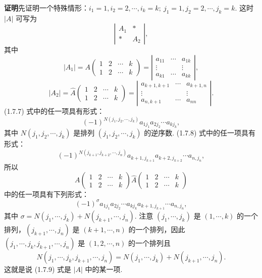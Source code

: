 \documentclass[UTF8,12pt,a4paper,fontset=fandol]{ctexart}
\begin{document}
\noindent\textbf{证明}\quad 先证明一个特殊情形：$i_1=1,i_2=2,\cdots,i_k=k;\ j_1=1,j_2=2,\cdots,j_k=k$. 这时 $|A|$ 可写为
\begin{equation}
\left|\begin{array}{cc}
A_1&*\\
*&A_2
\end{array}\right|,
\tag{1.7.6}
\end{equation}
其中
\begin{equation}
|A_1|=A\left(\begin{array}{cccc}
1&2&\cdots&k\\
1&2&\cdots&k
\end{array}\right)
=
\left|\begin{array}{ccc}
a_{11}&\cdots&a_{1k}\\
\vdots&&\vdots\\
a_{k1}&\cdots&a_{kk}
\end{array}\right|,
\tag{1.7.7}
\end{equation}
\begin{equation}
|A_2|=\widehat{A}\left(\begin{array}{cccc}
1&2&\cdots&k\\
1&2&\cdots&k
\end{array}\right)
=
\left|\begin{array}{ccc}
a_{k+1,k+1}&\cdots&a_{k+1,n}\\
\vdots&&\vdots\\
a_{n,k+1}&\cdots&a_{nn}
\end{array}\right|.
\tag{1.7.8}
\end{equation}
(1.7.7) 式中的任一项具有形式：
\[
(-1)^{N(j_1,j_2,\cdots,j_k)}a_{1j_1}a_{2j_2}\cdots a_{kj_k},
\]
其中 $N(j_1,j_2,\cdots,j_k)$ 是排列 $(j_1,j_2,\cdots,j_k)$ 的逆序数. (1.7.8) 式中的任一项具有形式：
\[
(-1)^{N(j_{k+1},j_{k+2},\cdots,j_n)}a_{k+1,j_{k+1}}a_{k+2,j_{k+2}}\cdots a_{n,j_n},
\]
所以
\[
A\left(\begin{array}{cccc}
1&2&\cdots&k\\
1&2&\cdots&k
\end{array}\right)
\widehat{A}\left(\begin{array}{cccc}
1&2&\cdots&k\\
1&2&\cdots&k
\end{array}\right)
\]
中的任一项具有下列形式：
\begin{equation}
(-1)^\sigma a_{1j_1}a_{2j_2}\cdots a_{kj_k}a_{k+1,j_{k+1}}\cdots a_{n,j_n},
\tag{1.7.9}
\end{equation}
其中 $\sigma=N(j_1,\cdots,j_k)+N(j_{k+1},\cdots,j_n)$. 注意 $(j_1,\cdots,j_k)$ 是 $(1,\cdots,k)$ 的一个排列，$(j_{k+1},\cdots,j_n)$ 是 $(k+1,\cdots,n)$ 的一个排列，因此 $(j_1,\cdots,j_k,j_{k+1},\cdots,j_n)$ 是 $(1,2,\cdots,n)$ 的一个排列且
\[
N(j_1,\cdots,j_k,j_{k+1},\cdots,j_n)=N(j_1,\cdots,j_k)+N(j_{k+1},\cdots,j_n).
\]
这就是说 (1.7.9) 式是 $|A|$ 中的某一项.
\end{document}
